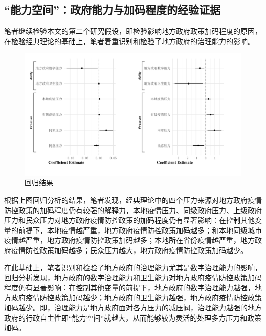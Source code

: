 \documentclass[
  12pt,
]{ctexart}
\begin{document}
\hypertarget{ux80fdux529bux7a7aux95f4ux653fux5e9cux80fdux529bux4e0eux52a0ux7801ux7a0bux5ea6ux7684ux7ecfux9a8cux8bc1ux636e}{%
\subsection{``能力空间''：政府能力与加码程度的经验证据}\label{ux80fdux529bux7a7aux95f4ux653fux5e9cux80fdux529bux4e0eux52a0ux7801ux7a0bux5ea6ux7684ux7ecfux9a8cux8bc1ux636e}}

笔者继续检验本文的第二个研究假设，即检验影响地方政府政策加码程度的原因，在检验经典理论的基础上，笔者着重识别和检验了地方政府的治理能力的影响。

\begin{figure}[h]
\includegraphics[width=1\linewidth]{../figures/figure1} \caption{回归结果}\label{fig:unnamed-chunk-5}
\end{figure}

根据上图回归分析的结果，笔者发现，经典理论中的四个压力来源对地方政府疫情防控政策的加码程度仍有较强的解释力，本地疫情压力、同级政府压力、上级政府压力和民众压力对地方政府疫情防控政策的加码程度仍有显著影响：在控制其他变量的前提下，本地疫情越严重，地方政府疫情防控政策加码越多；和本地同级城市疫情越严重，地方政府疫情防控政策加码越多；本地所在省份疫情越严重，地方政府疫情防控政策加码越多；民众压力越大，地方政府疫情防控政策加码越少。

在此基础上，笔者识别和检验了地方政府的治理能力尤其是数字治理能力的影响，回归分析发现，地方政府的数字治理能力和卫生能力对地方政府疫情防控政策加码程度仍有显著影响：在控制其他变量的前提下，地方政府的数字治理能力越强，地方政府疫情防控政策加码越少；地方政府的卫生能力越强，地方政府疫情防控政策加码越少。即，治理能力是地方政府面对各方压力的减压阀，治理能力越强的地方政府的行政自主性即``能力空间''就越大，从而能够较为灵活的处理多方压力和政策加码。
\end{document}
